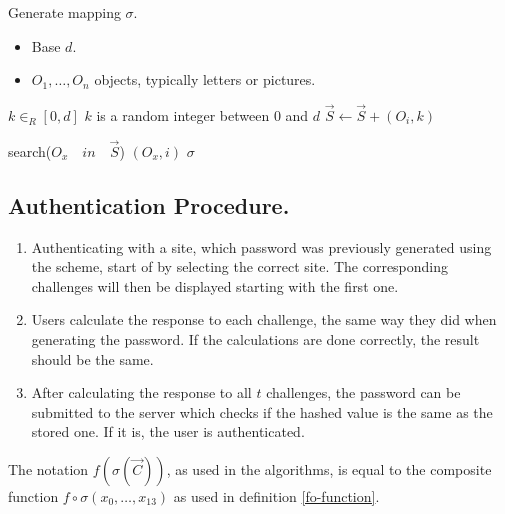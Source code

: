 \begin{algorithm}
    \caption{Generate mapping $\sigma$.}
    \begin{algorithmic}[1]
        \Require
            \Statex \begin{itemize}
                \item Base $d$.
                \item $O_1,\dots,O_n$ objects, typically letters or pictures.
            \end{itemize}
        
        \State $k \in_{R} [0,d]$
            \Comment $k$ is a random integer between $0$ and $d$
            \State $\vec S \leftarrow \vec S + (O_i,k)$
        \EndFor
        \Statex

            \State search($O_x\quad in\quad \vec S$)
            \State \Return $(O_x, i)$
        \EndFunction
        \Statex
        \Ensure $\sigma$
    \end{algorithmic}
    \label{gen-mapping}
\end{algorithm}
\subsection{Authentication Procedure.}\label{subsec:auth}
\begin{enumerate}
    \item Authenticating with a site, which password was previously generated using the scheme, start of by selecting the correct site. The corresponding challenges will then be displayed starting with the first one.
    \item Users calculate the response to each challenge, the same way they did when generating the password. If the calculations are done correctly, the result should be the same.
    \item After calculating the response to all $t$ challenges, the password can be submitted to the server which checks if the hashed value is the same as the stored one. If it is, the user is authenticated.
\end{enumerate}

\begin{remark}
    The notation $f(\sigma(\vec C))$, as used in the algorithms, is equal to the composite function $f \circ \sigma(x_0,\dots,x_{13})$ as used in definition \ref{fo-function}.
\end{remark}

